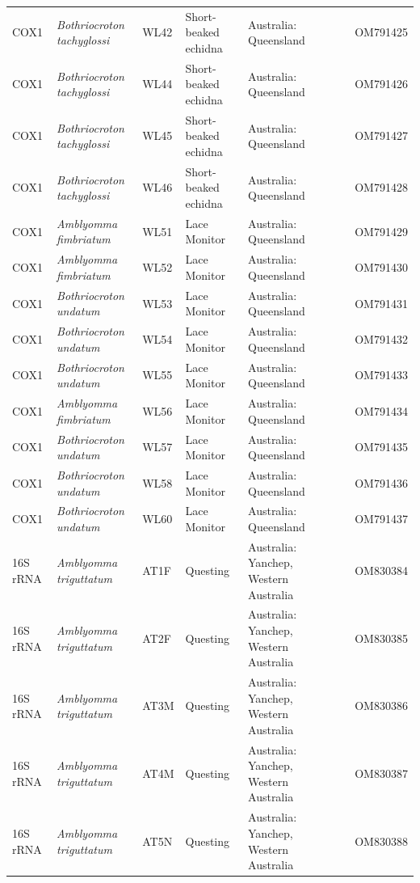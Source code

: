 \documentclass[a4paper, nobind]{templates/ociamthesis}
\begin{document}
\begin{landscape}
\begin{longtable}[t]{l>{}lllllll}
COX1 & \em{Bothriocroton tachyglossi} & WL42 & Short-beaked echidna & Australia: Queensland &  &  & OM791425\\
COX1 & \em{Bothriocroton tachyglossi} & WL44 & Short-beaked echidna & Australia: Queensland &  &  & OM791426\\
COX1 & \em{Bothriocroton tachyglossi} & WL45 & Short-beaked echidna & Australia: Queensland &  &  & OM791427\\
COX1 & \em{Bothriocroton tachyglossi} & WL46 & Short-beaked echidna & Australia: Queensland &  &  & OM791428\\
COX1 & \em{Amblyomma fimbriatum} & WL51 & Lace Monitor & Australia: Queensland &  &  & OM791429\\
COX1 & \em{Amblyomma fimbriatum} & WL52 & Lace Monitor & Australia: Queensland &  &  & OM791430\\
COX1 & \em{Bothriocroton undatum} & WL53 & Lace Monitor & Australia: Queensland &  &  & OM791431\\
COX1 & \em{Bothriocroton undatum} & WL54 & Lace Monitor & Australia: Queensland &  &  & OM791432\\
COX1 & \em{Bothriocroton undatum} & WL55 & Lace Monitor & Australia: Queensland &  &  & OM791433\\
COX1 & \em{Amblyomma fimbriatum} & WL56 & Lace Monitor & Australia: Queensland &  &  & OM791434\\
COX1 & \em{Bothriocroton undatum} & WL57 & Lace Monitor & Australia: Queensland &  &  & OM791435\\
COX1 & \em{Bothriocroton undatum} & WL58 & Lace Monitor & Australia: Queensland &  &  & OM791436\\
COX1 & \em{Bothriocroton undatum} & WL60 & Lace Monitor & Australia: Queensland &  &  & OM791437\\
16S rRNA & \em{Amblyomma triguttatum} & AT1F & Questing & Australia: Yanchep, Western Australia &  &  & OM830384\\
16S rRNA & \em{Amblyomma triguttatum} & AT2F & Questing & Australia: Yanchep, Western Australia &  &  & OM830385\\
16S rRNA & \em{Amblyomma triguttatum} & AT3M & Questing & Australia: Yanchep, Western Australia &  &  & OM830386\\
16S rRNA & \em{Amblyomma triguttatum} & AT4M & Questing & Australia: Yanchep, Western Australia &  &  & OM830387\\
16S rRNA & \em{Amblyomma triguttatum} & AT5N & Questing & Australia: Yanchep, Western Australia &  &  & OM830388\\

\end{longtable}
\end{landscape}
\end{document}
